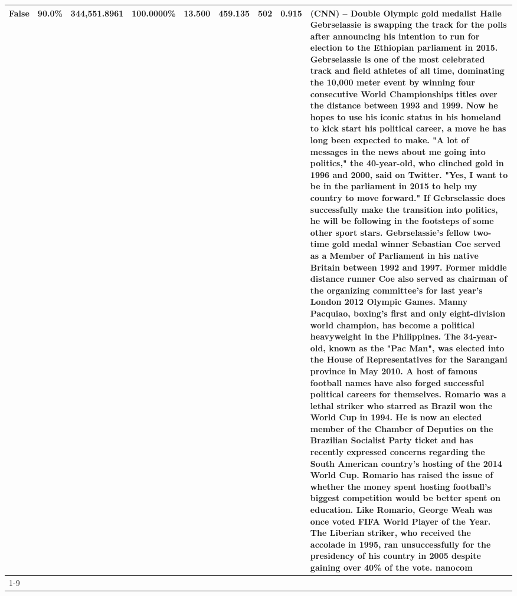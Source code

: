 \begin{table}[H]
{\begin{tabular}{lllrlllll}
False & 90.0\% & 344,551.8961 & \bfseries \color{red} 100.0000\% & 13.500 & 459.135 & 502 & 0.915 & (CNN) -- Double Olympic gold medalist Haile Gebrselassie is swapping the track for the polls after announcing his intention to run for election to the Ethiopian parliament in 2015. Gebrselassie is one of the most celebrated track and field athletes of all time, dominating the 10,000 meter event by winning four consecutive World Championships titles over the distance between 1993 and 1999. Now he hopes to use his iconic status in his homeland to kick start his political career, a move he has long been expected to make. "A lot of messages in the news about me going into politics," the 40-year-old, who clinched gold in 1996 and 2000, said on Twitter. "Yes, I want to be in the parliament in 2015 to help my country to move forward." If Gebrselassie does successfully make the transition into politics, he will be following in the footsteps of some other sport stars. Gebrselassie's fellow two-time gold medal winner Sebastian Coe served as a Member of Parliament in his native Britain between 1992 and 1997. Former middle distance runner Coe also served as chairman of the organizing committee's for last year's London 2012 Olympic Games. Manny Pacquiao, boxing's first and only eight-division world champion, has become a political heavyweight in the Philippines. The 34-year-old, known as the "Pac Man", was elected into the House of Representatives for the Sarangani province in May 2010. A host of famous football names have also forged successful political careers for themselves. Romario was a lethal striker who starred as Brazil won the World Cup in 1994. He is now an elected member of the Chamber of Deputies on the Brazilian Socialist Party ticket and has recently expressed concerns regarding the South American country's hosting of the 2014 World Cup. Romario has raised the issue of whether the money spent hosting football's biggest competition would be better spent on education. Like Romario, George Weah was once voted FIFA World Player of the Year. The Liberian striker, who received the accolade in 1995, ran unsuccessfully for the presidency of his country in 2005 despite gaining over 40\% of the vote. nanocom \\
\cline{1-9}

\end{tabular}}
\end{table}
